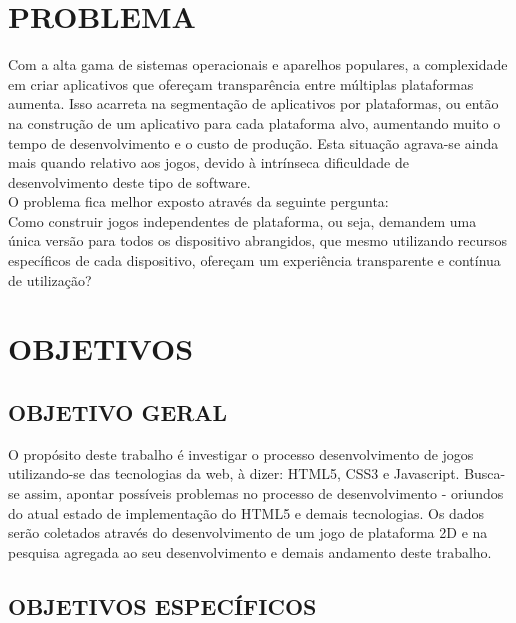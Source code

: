 \documentclass{article}
\begin{document}
\section{PROBLEMA}

Com a alta gama de sistemas operacionais e aparelhos populares, a complexidade em criar aplicativos que ofereçam transparência entre múltiplas plataformas aumenta. Isso acarreta na segmentação de aplicativos por plataformas, ou então na construção de um aplicativo para cada plataforma alvo, aumentando muito o tempo de desenvolvimento e o custo de produção. Esta situação agrava-se ainda mais quando relativo aos jogos, devido à intrínseca dificuldade de desenvolvimento deste tipo de software.
\\
O problema fica melhor exposto através da seguinte pergunta:
\\
	Como construir jogos independentes de plataforma, ou seja, demandem uma única versão para todos os dispositivo abrangidos, que mesmo utilizando recursos específicos de cada dispositivo, ofereçam um experiência transparente e contínua de utilização?

\section{OBJETIVOS}
\subsection{OBJETIVO GERAL}

O propósito deste trabalho é investigar o processo desenvolvimento de jogos utilizando-se das tecnologias da web, à dizer: HTML5, CSS3 e Javascript. Busca-se assim, apontar possíveis problemas no processo de desenvolvimento - oriundos do atual estado de implementação do HTML5  e demais tecnologias. Os dados serão coletados através do desenvolvimento de um jogo de plataforma 2D e na pesquisa agregada ao seu desenvolvimento e demais andamento deste trabalho.


\subsection{OBJETIVOS ESPECÍFICOS}
\end{document}
